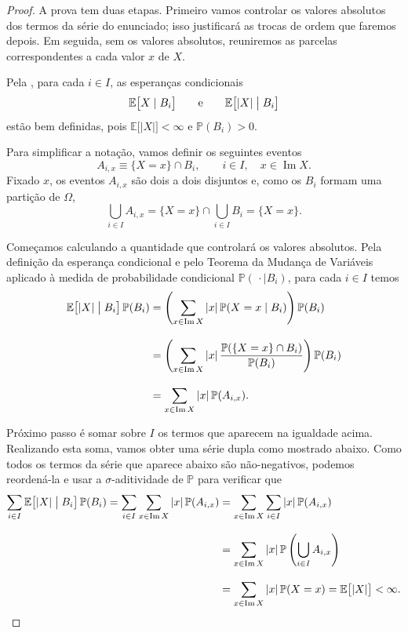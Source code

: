 \documentclass[12pt,portuguese]{article}
\theoremstyle{definition}
\begin{document}
\begin{proof}
A prova tem duas etapas. Primeiro vamos controlar os valores absolutos
dos termos da série do enunciado; isso justificará as trocas de ordem que
faremos depois. Em seguida, sem os valores absolutos, reuniremos as
parcelas correspondentes a cada valor \(x\) de \(X\).

Pela , para cada \(i\in I\),
as esperanças condicionais
\[
\mathbb{E}\bigl[X \mid B_i\bigr]
\qquad\text{e}\qquad
\mathbb{E}\bigl[|X| \bigm| B_i\bigr]
\]
estão bem definidas, pois \(\mathbb{E}\bigl[|X|\bigr] < \infty\) e
\(\mathbb{P}(B_i)>0\).

Para simplificar a notação, vamos definir os seguintes eventos
\[
A_{i,x}\equiv \{X=x\}\cap B_i,
\qquad i\in I,\quad x\in\operatorname{Im}X.
\]
Fixado \(x\), os eventos \(A_{i,x}\) são dois a dois disjuntos e, como os
\(B_i\) formam uma partição de \(\Omega\),
\[
\bigcup_{i\in I} A_{i,x}
=\{X=x\}\cap\bigcup_{i\in I}B_i
=\{X=x\}.
\]

Começamos calculando a quantidade que controlará os valores absolutos. Pela definição da
esperança condicional e pelo Teorema da Mudança de Variáveis aplicado à
medida de probabilidade condicional
\(\mathbb{P}(\,\cdot\mid B_i)\), para cada \(i\in I\) temos
\[
\begin{aligned}
\mathbb{E}\bigl[|X| \bigm| B_i\bigr]\,\mathbb{P}(B_i)
&=\left(\sum_{x\in\operatorname{Im}X}|x|\,
\mathbb{P}(X=x\mid B_i)\right)\mathbb{P}(B_i) 
\\[0.3cm]
&=\left(\sum_{x\in\operatorname{Im}X}|x|\,
\frac{\mathbb{P}(\{X=x\}\cap B_i)}{\mathbb{P}(B_i)} \right)\mathbb{P}(B_i) 
\\[0.3cm]
&=\sum_{x\in\operatorname{Im}X}|x|\,\mathbb{P}(A_{i,x}).
\end{aligned}
\]

Próximo passo é somar sobre $I$ os termos que aparecem na igualdade acima.
Realizando esta soma, vamos obter uma série dupla como mostrado abaixo.
Como todos os termos da série que aparece abaixo são não-negativos, 
podemos reordená-la e usar 
a \(\sigma\)-aditividade de \(\mathbb{P}\) para verificar que 
\begin{align}\label{eq-aux1-teo-part-esp}
\sum_{i\in I}\mathbb{E}\bigl[|X| \bigm| B_i\bigr]\,\mathbb{P}(B_i)
=\sum_{i\in I}\sum_{x\in\operatorname{Im}X}
|x|\,\mathbb{P}(A_{i,x}) 
&=\sum_{x\in\operatorname{Im}X}\sum_{i\in I}
|x|\,\mathbb{P}(A_{i,x}) 
\nonumber\\[0.3cm]
&=\sum_{x\in\operatorname{Im}X}|x|\,\mathbb{P}\left(\bigcup_{i\in I}A_{i,x}\right) 
\nonumber\\[0.3cm]
&=\sum_{x\in\operatorname{Im}X}|x|\,\mathbb{P}(X=x)
=\mathbb{E}\bigl[|X|\bigr]<\infty.
\end{align}


\end{proof}
\end{document}
